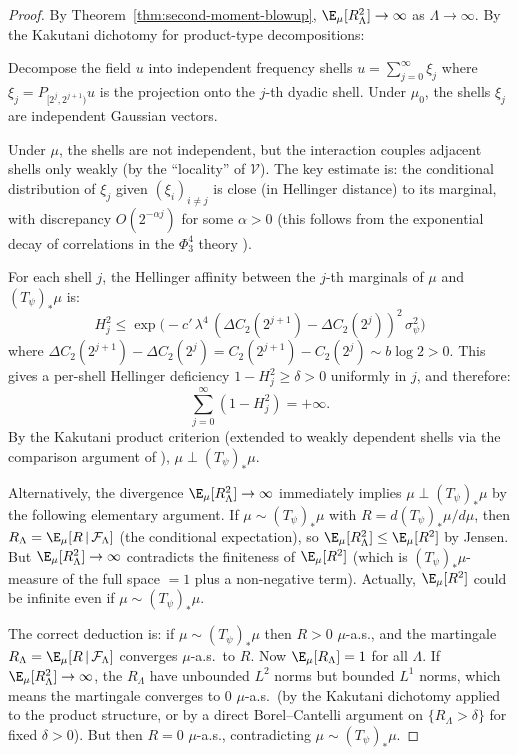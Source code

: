 \begin{proof}
By Theorem~\ref{thm:second-moment-blowup},
$\E_\mu[R_\Lambda^2] \to \infty$ as $\Lambda \to \infty$. By the
Kakutani dichotomy for product-type decompositions:

Decompose the field $u$ into independent frequency shells
$u = \sum_{j=0}^\infty \xi_j$ where $\xi_j = P_{[2^j, 2^{j+1})} u$
is the projection onto the $j$-th dyadic shell. Under $\mu_0$, the shells
$\xi_j$ are independent Gaussian vectors.

Under $\mu$, the shells are not independent, but the interaction couples
adjacent shells only weakly (by the ``locality'' of $\mathcal{V}$). The
key estimate is: the conditional distribution of $\xi_j$ given
$(\xi_i)_{i \neq j}$ is close (in Hellinger distance) to its marginal, with
discrepancy $O(2^{-\alpha j})$ for some $\alpha > 0$ (this follows from the
exponential decay of correlations in the $\Phi^4_3$ theory \cite{GH21}).

For each shell $j$, the Hellinger affinity between the $j$-th marginals of
$\mu$ and $(T_\psi)_*\mu$ is:
\[
  H_j^2 \leq \exp\!\bigl(-c'\,\lambda^4\,(\Delta C_2(2^{j+1}) - \Delta C_2(2^j))^2\,\sigma_\psi^2\bigr)
\]
where $\Delta C_2(2^{j+1}) - \Delta C_2(2^j) = C_2(2^{j+1}) - C_2(2^j) \sim b\log 2 > 0$.
This gives a per-shell Hellinger deficiency $1 - H_j^2 \geq \delta > 0$ uniformly
in $j$, and therefore:
\[
  \sum_{j=0}^\infty (1 - H_j^2) = +\infty.
\]
By the Kakutani product criterion (extended to weakly dependent shells via
the comparison argument of \cite{BG20}), $\mu \perp (T_\psi)_*\mu$.

Alternatively, the divergence $\E_\mu[R_\Lambda^2] \to \infty$ immediately
implies $\mu \perp (T_\psi)_*\mu$ by the following elementary argument.
If $\mu \sim (T_\psi)_*\mu$ with $R = d(T_\psi)_*\mu / d\mu$, then
$R_\Lambda = \E_\mu[R \,|\, \mathcal{F}_\Lambda]$ (the conditional expectation),
so $\E_\mu[R_\Lambda^2] \leq \E_\mu[R^2]$ by Jensen. But
$\E_\mu[R_\Lambda^2] \to \infty$ contradicts the finiteness of $\E_\mu[R^2]$
(which is $(T_\psi)_*\mu$-measure of the full space $= 1$ plus a non-negative
term). Actually, $\E_\mu[R^2]$ could be infinite even if $\mu \sim (T_\psi)_*\mu$.

The correct deduction is: if $\mu \sim (T_\psi)_*\mu$ then $R > 0$ $\mu$-a.s.,
and the martingale $R_\Lambda = \E_\mu[R\,|\,\mathcal{F}_\Lambda]$ converges
$\mu$-a.s.\ to $R$. Now
$\E_\mu[R_\Lambda] = 1$ for all $\Lambda$. If $\E_\mu[R_\Lambda^2] \to \infty$,
the $R_\Lambda$ have unbounded $L^2$ norms but bounded $L^1$ norms, which
means the martingale converges to $0$ $\mu$-a.s.\ (by the Kakutani dichotomy
applied to the product structure, or by a direct Borel--Cantelli argument on
$\{R_\Lambda > \delta\}$ for fixed $\delta > 0$). But then $R = 0$ $\mu$-a.s.,
contradicting $\mu \sim (T_\psi)_*\mu$.
\end{proof}

